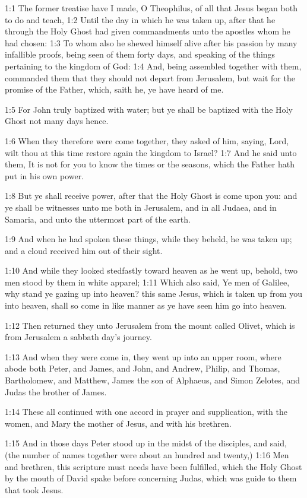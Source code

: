 

1:1 The former treatise have I made, O Theophilus, of all that Jesus began both to do and teach, 1:2 Until the day in which he was taken up, after that he through the Holy Ghost had given commandments unto the apostles whom he had chosen: 1:3 To whom also he shewed himself alive after his passion by many infallible proofs, being seen of them forty days, and speaking of the things pertaining to the kingdom of God: 1:4 And, being assembled together with them, commanded them that they should not depart from Jerusalem, but wait for the promise of the Father, which, saith he, ye have heard of me.

1:5 For John truly baptized with water; but ye shall be baptized with the Holy Ghost not many days hence.

1:6 When they therefore were come together, they asked of him, saying, Lord, wilt thou at this time restore again the kingdom to Israel?  1:7 And he said unto them, It is not for you to know the times or the seasons, which the Father hath put in his own power.

1:8 But ye shall receive power, after that the Holy Ghost is come upon you: and ye shall be witnesses unto me both in Jerusalem, and in all Judaea, and in Samaria, and unto the uttermost part of the earth.

1:9 And when he had spoken these things, while they beheld, he was taken up; and a cloud received him out of their sight.

1:10 And while they looked stedfastly toward heaven as he went up, behold, two men stood by them in white apparel; 1:11 Which also said, Ye men of Galilee, why stand ye gazing up into heaven? this same Jesus, which is taken up from you into heaven, shall so come in like manner as ye have seen him go into heaven.

1:12 Then returned they unto Jerusalem from the mount called Olivet, which is from Jerusalem a sabbath day's journey.

1:13 And when they were come in, they went up into an upper room, where abode both Peter, and James, and John, and Andrew, Philip, and Thomas, Bartholomew, and Matthew, James the son of Alphaeus, and Simon Zelotes, and Judas the brother of James.

1:14 These all continued with one accord in prayer and supplication, with the women, and Mary the mother of Jesus, and with his brethren.

1:15 And in those days Peter stood up in the midst of the disciples, and said, (the number of names together were about an hundred and twenty,) 1:16 Men and brethren, this scripture must needs have been fulfilled, which the Holy Ghost by the mouth of David spake before concerning Judas, which was guide to them that took Jesus.

